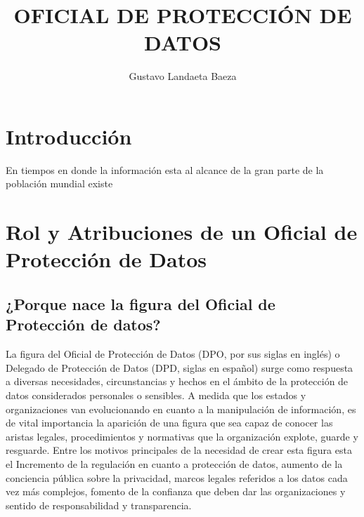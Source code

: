 \documentclass[stu, 11pt, letterpaper, donotrepeattitle, floatsintext, natbib]{apa7}
\title{\Large OFICIAL DE PROTECCIÓN DE DATOS}
\author{Gustavo Landaeta Baeza } %
\begin{document}
\maketitle


\renewcommand\contentsname{\largeÍndice}
\tableofcontents
\setcounter{tocdepth}{2}
\newpage
\renewcommand{\listfigurename}{\largeÍndice de fíguras}
\listoffigures
\newpage
\renewcommand{\listtablename}{\largeÍndice de tablas}
\listoftables
\newpage


\section{\large Introducción}

\justify

\hspace{1.27cm} En tiempos en donde la información esta al alcance de la gran parte de la población mundial existe 
\hfill \break 


\newpage

\section{\large Rol y Atribuciones de un Oficial de Protección de Datos}

\subsection{¿Porque nace la figura del Oficial de Protección de datos?} 
La figura del Oficial de Protección de Datos (DPO, por sus siglas en inglés) o Delegado de Protección de Datos (DPD, siglas en español) surge como respuesta a diversas necesidades, circunstancias y hechos en el ámbito de la protección de datos considerados personales o sensibles. A medida que los estados y organizaciones van evolucionando en cuanto a la manipulación de información, es de vital importancia la aparición de una figura que sea capaz de conocer las aristas legales, procedimientos y normativas que la organización explote, guarde y resguarde.
	Entre los motivos principales de la necesidad de crear esta figura esta el Incremento de la regulación en cuanto a protección de datos, aumento de la conciencia pública sobre la privacidad, marcos legales referidos a los datos cada vez más complejos, fomento de la confianza que deben dar las organizaciones y sentido de responsabilidad y transparencia.
\end{document}
